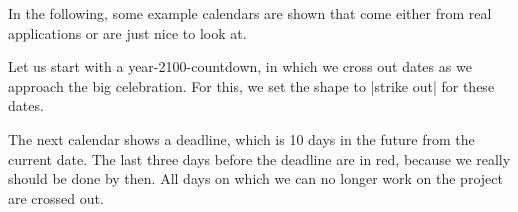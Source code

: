 In the following, some example calendars are shown that come either from real
applications or are just nice to look at.

Let us start with a year-2100-countdown, in which we cross out dates as we
approach the big celebration. For this, we set the shape to |strike out| for
these dates.
%
\begin{codeexample}[
    leave comments,
    preamble={\usetikzlibrary{calendar,shapes.misc}},
]
\end{codeexample}

The next calendar shows a deadline, which is 10 days in the future from the
current date. The last three days before the deadline are in red, because we
really should be done by then. All days on which we can no longer work on the
project are crossed out.
%
\begin{codeexample}[
    leave comments,
    preamble={\usetikzlibrary{calendar,shapes.misc}},
]
\end{codeexample}

